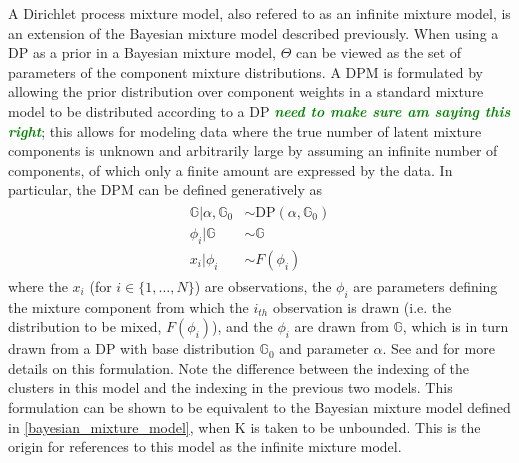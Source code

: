 \documentclass[smallcondensed, final]{svjour3}
\newcommand{\willie}[1]{\textcolor{green}{\textsf{\emph{\textbf{\textcolor{green}{#1}}}}}}
\begin{document}
A Dirichlet process mixture model, also refered to as an infinite mixture model, is an extension of the Bayesian mixture model described previously. 
When using a DP as a prior in a Bayesian mixture model, $\Theta$ can be viewed as the set of parameters of the component mixture distributions. 	A DPM is formulated by allowing the prior distribution over component weights in a standard mixture model to be distributed according to a DP \willie{need to make sure am saying this right}; this allows for modeling data where the true number of latent mixture components is unknown and arbitrarily large by assuming an infinite number of components, of which only a finite amount are expressed by the data. In particular, the DPM can be defined generatively as
\begin{align}
\begin{split}
	\mathbb{G} | \alpha, \mathbb{G}_{0}  &\sim  \text{DP}(\alpha, \mathbb{G}_{0}) \\
	\phi_{i} | \mathbb{G}  &\sim  \mathbb{G} \\
	x_{i}|\phi_{i} &\sim F(\phi_{i})
\end{split}
\end{align}
where the $x_{i}$ (for $i \in \{ 1, \ldots, N \}$) are observations, the $\phi_{i}$ are parameters defining the mixture component from which the $i_{th}$ observation is drawn (i.e. the distribution to be mixed, $F(\phi_{i})$), and the $\phi_{i}$ are drawn from $\mathbb{G}$, which is in turn drawn from a DP with base distribution $\mathbb{G}_{0}$ and parameter $\alpha$. See \cite{gasthaus_2008} and \cite{gasthaus_thesis} for more details on this formulation. Note the difference between the indexing of the clusters in this model and the indexing in the previous two models. This formulation can be shown to be equivalent to the Bayesian mixture model defined in \eqref{bayesian_mixture_model}, when K is taken to be unbounded. This is the origin for references to this model as the infinite mixture model.
\end{document}
